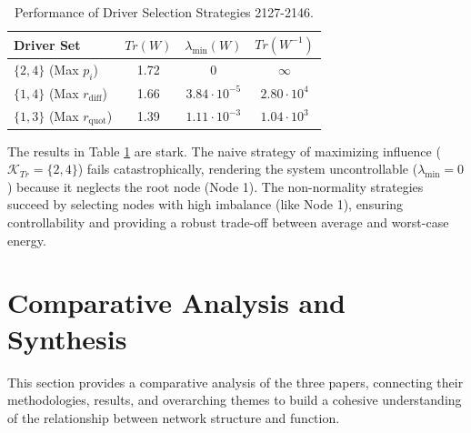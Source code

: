 \documentclass[10pt, a4paper]{article}
\begin{document}
\begin{table}[H]
    \centering
    \caption{Performance of Driver Selection Strategies {2127-2146}.}
    \label{tab:performance_case_study}
    \begin{tabular}{@{}lccc@{}}
        \toprule
        \textbf{Driver Set} & \textbf{$Tr(W)$} & \textbf{$\lambda_{\min}(W)$} & \textbf{$Tr(W^{-1})$} \\ \midrule
        $\{2,4\}$ (Max $p_i$) & 1.72 & 0 & $\infty$ \\
        $\{1,4\}$ (Max $r_{\text{diff}}$) & 1.66 & $3.84 \cdot 10^{-5}$ & $2.80 \cdot 10^4$ \\
        $\{1,3\}$ (Max $r_{\text{quot}}$) & 1.39 & $1.11 \cdot 10^{-3}$ & $1.04 \cdot 10^3$ \\ \bottomrule
    \end{tabular}
\end{table}

The results in Table \ref{tab:performance_case_study} are stark. The naive strategy of maximizing influence ($\mathcal{K}_{Tr}=\{2,4\}$) fails catastrophically, rendering the system uncontrollable ($\lambda_{\min}=0$) because it neglects the root node (Node 1). The non-normality strategies succeed by selecting nodes with high imbalance (like Node 1), ensuring controllability and providing a robust trade-off between average and worst-case energy.


\section{Comparative Analysis and Synthesis}

This section provides a comparative analysis of the three papers, connecting their methodologies, results, and overarching themes to build a cohesive understanding of the relationship between network structure and function.
\end{document}
